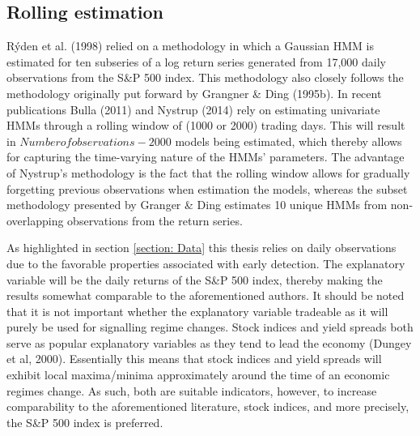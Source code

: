 \subsection{Rolling estimation}
Rýden et al. (1998) relied on a methodology in which a Gaussian HMM is estimated for ten subseries of a log return series generated from 17,000 daily observations from the S\&P 500 index. This methodology also closely follows the methodology originally put forward by Grangner \& Ding (1995b). In recent publications Bulla (2011) and Nystrup (2014) rely on estimating univariate HMMs through a rolling window of (1000 or 2000) trading days. This will result in $Number of observations - 2000$ models being estimated, which thereby allows for capturing the time-varying nature of the HMMs' parameters. The advantage of Nystrup's methodology is the fact that the rolling window allows for gradually forgetting previous observations when estimation the models, whereas the subset methodology presented by Granger \& Ding estimates 10 unique HMMs from non-overlapping observations from the return series. 

As highlighted in section \ref{section: Data} this thesis relies on daily observations due to the favorable properties associated with early detection. The explanatory variable will be the daily returns of the S\&P 500 index, thereby making the results somewhat comparable to the aforementioned authors. It should be noted that it is not important whether the explanatory variable tradeable as it will purely be used for signalling regime changes. Stock indices and yield spreads both serve as popular explanatory variables as they tend to lead the economy (Dungey et al, 2000). Essentially this means that stock indices and yield spreads will exhibit local maxima/minima approximately around the time of an economic regimes change. As such, both are suitable indicators, however, to increase comparability to the aforementioned literature, stock indices, and more precisely, the S\&P 500 index is preferred. 

